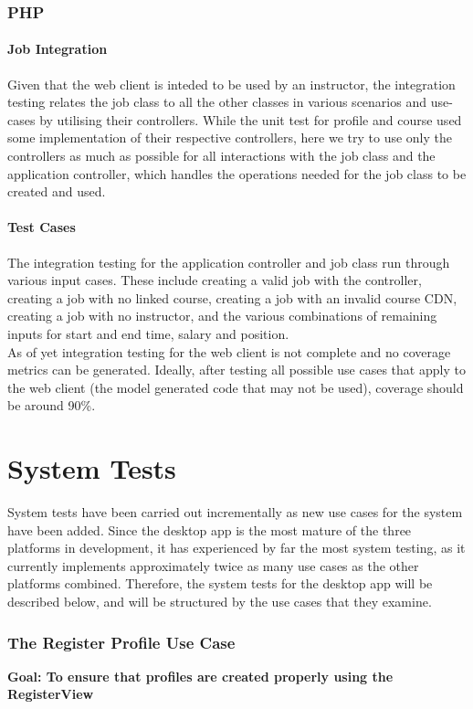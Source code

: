 \documentclass[12pt]{report}
\begin{document}
\section{PHP}
\subsection{Job Integration}
	Given that the web client is inteded to be used by an instructor, the integration testing relates the job class to all the other classes in various scenarios and use-cases by utilising their controllers. While the unit test for profile and course used some implementation of their respective controllers, here we try to use only the controllers as much as possible for all interactions with the job class and the application controller, which handles the operations needed for the job class to be created and used.

\subsection{Test Cases}
	The integration testing for the application controller and job class run through various input cases. These include creating a valid job with the controller, creating a job with no linked course, creating a job with an invalid course CDN, creating a job with no instructor, and the various combinations of remaining inputs for start and end time, salary and position.\\

	As of yet integration testing for the web client is not complete and no coverage metrics can be generated. Ideally, after testing all possible use cases that apply to the web client (the model generated code that may not be used), coverage should be around 90\%.\\
\part{System Tests}
System tests have been carried out incrementally as new use cases for the system have been added.
Since the desktop app is the most mature of the three platforms in development, it has experienced
by far the most system testing, as it currently implements approximately twice as many use cases as
the other platforms combined. Therefore, the system tests for the desktop app will be described
below, and will be structured by the use cases that they examine.

\section{The Register Profile Use Case}
\label{s:six}
\textbf{Goal: To ensure that profiles are created properly using the RegisterView}
\end{document}
